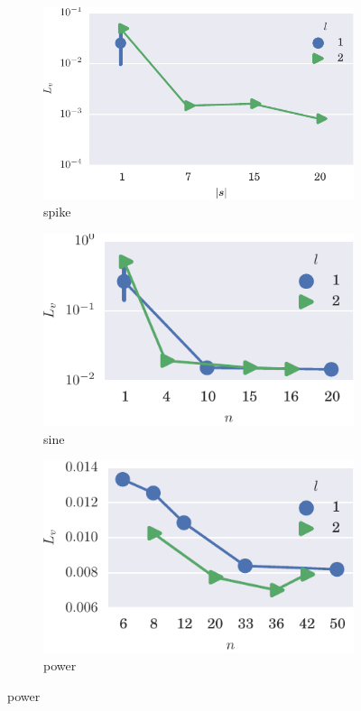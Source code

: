 \begin{figure}[t!]
    \centering
  
  \begin{subfigure}[t]{\textwidth} %
        \centering
        \includegraphics[]{figs/bo_spike.pdf}
        \caption{spike}
    \end{subfigure}%
  
    \begin{subfigure}[t]{\textwidth}
        \centering
        \includegraphics[]{figs/bo_sin.pdf}
        \caption{sine}
    \end{subfigure}%

    \begin{subfigure}[t]{\textwidth} 
        \centering
        \includegraphics[]{figs/bo_power.pdf}
        \caption{power}
    \end{subfigure}%

\end{figure}
